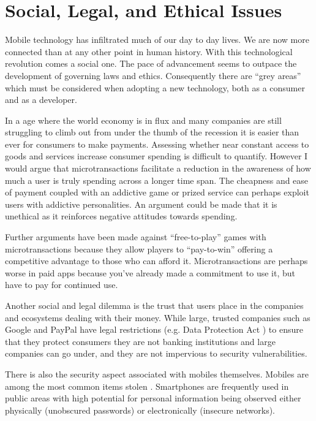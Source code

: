 \documentclass[paper=a4, fontsize=12pt]{scrartcl}	%
\numberwithin{equation}{section}															%
\numberwithin{figure}{section}																%
\numberwithin{table}{section}
\begin{document}
\section{Social, Legal, and Ethical Issues}

Mobile technology has infiltrated much of our day to day lives. We are now more connected than at any other point in human history. With this technological revolution comes a social one. The pace of advancement seems to outpace the development of governing laws and ethics. Consequently there are ``grey areas'' which must be considered when adopting a new technology, both as a consumer and as a developer.

In a age where the world economy is in flux and many companies are still struggling to climb out from under the thumb of the recession it is easier than ever for consumers to make payments. Assessing whether near constant access to goods and services increase consumer spending is difficult to quantify. However I would argue that microtransactions facilitate a reduction in the awareness of how much a user is truly spending across a longer time span. The cheapness and ease of payment coupled with an addictive game or prized service can perhaps exploit users with addictive personalities. An argument could be made that it is unethical as it reinforces negative attitudes towards spending. 

Further arguments \cite{tech2015micro} have been made against ``free-to-play'' games with microtransactions because they allow players to ``pay-to-win'' offering a competitive advantage to those who can afford it. Microtransactions are perhaps worse in paid apps because you've already made a commitment to use it, but have to pay for continued use.

Another social and legal dilemma is the trust that users place in the companies and ecosystems dealing with their money. While large, trusted companies such as Google and PayPal have legal restrictions (e.g. Data Protection Act \cite{uk1998data}) to ensure that they protect consumers they are not banking institutions and large companies can go under, and they are not impervious to security vulnerabilities. 

There is also the security aspect associated with mobiles themselves. Mobiles are among the most common items stolen \cite{police2016data}. Smartphones are frequently used in public areas with high potential for personal information being observed either physically (unobscured passwords) or electronically (insecure networks). 
\end{document}
